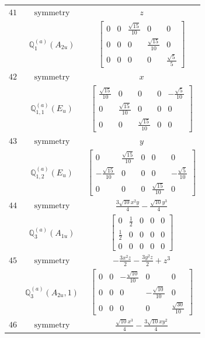 \documentclass[fleqn,8pt,landscape]{jsarticle}
\begin{document}
\begin{longtable}{ccc}
$ 41 $ & $ \text{symmetry} $ & $ z $ \\
$  $ & $ \mathbb{Q}_{1}^{(a)}(A_{2u}) $ & $ \begin{bmatrix} 0 & 0 & \frac{\sqrt{15}}{10} & 0 & 0 \\ 0 & 0 & 0 & \frac{\sqrt{15}}{10} & 0 \\ 0 & 0 & 0 & 0 & \frac{\sqrt{5}}{5} \end{bmatrix} $ \\ \hline
$ 42 $ & $ \text{symmetry} $ & $ x $ \\
$  $ & $ \mathbb{Q}_{1,1}^{(a)}(E_{u}) $ & $ \begin{bmatrix} \frac{\sqrt{15}}{10} & 0 & 0 & 0 & - \frac{\sqrt{5}}{10} \\ 0 & \frac{\sqrt{15}}{10} & 0 & 0 & 0 \\ 0 & 0 & \frac{\sqrt{15}}{10} & 0 & 0 \end{bmatrix} $ \\ \hline
$ 43 $ & $ \text{symmetry} $ & $ y $ \\
$  $ & $ \mathbb{Q}_{1,2}^{(a)}(E_{u}) $ & $ \begin{bmatrix} 0 & \frac{\sqrt{15}}{10} & 0 & 0 & 0 \\ - \frac{\sqrt{15}}{10} & 0 & 0 & 0 & - \frac{\sqrt{5}}{10} \\ 0 & 0 & 0 & \frac{\sqrt{15}}{10} & 0 \end{bmatrix} $ \\ \hline
$ 44 $ & $ \text{symmetry} $ & $ \frac{3 \sqrt{10} x^{2} y}{4} - \frac{\sqrt{10} y^{3}}{4} $ \\
$  $ & $ \mathbb{Q}_{3}^{(a)}(A_{1u}) $ & $ \begin{bmatrix} 0 & \frac{1}{2} & 0 & 0 & 0 \\ \frac{1}{2} & 0 & 0 & 0 & 0 \\ 0 & 0 & 0 & 0 & 0 \end{bmatrix} $ \\ \hline
$ 45 $ & $ \text{symmetry} $ & $ - \frac{3 x^{2} z}{2} - \frac{3 y^{2} z}{2} + z^{3} $ \\
$  $ & $ \mathbb{Q}_{3}^{(a)}(A_{2u},1) $ & $ \begin{bmatrix} 0 & 0 & - \frac{\sqrt{10}}{10} & 0 & 0 \\ 0 & 0 & 0 & - \frac{\sqrt{10}}{10} & 0 \\ 0 & 0 & 0 & 0 & \frac{\sqrt{30}}{10} \end{bmatrix} $ \\ \hline
$ 46 $ & $ \text{symmetry} $ & $ \frac{\sqrt{10} x^{3}}{4} - \frac{3 \sqrt{10} x y^{2}}{4} $ \\

\end{longtable}
\end{document}
